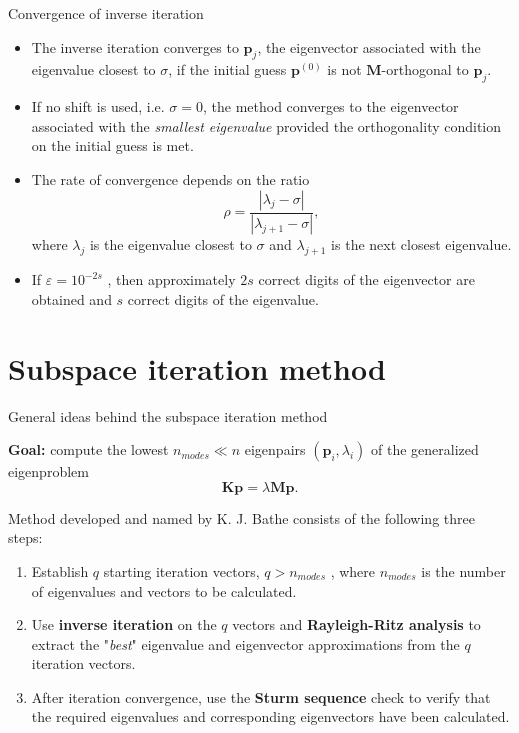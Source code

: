 \documentclass[aspectratio=169]{beamer}
\begin{document}
\begin{frame}{Convergence of inverse iteration}
  \begin{tcolorbox}[colback=darkred!10,colframe=darkred!40!black]
    \begin{itemize}
      \item  The inverse iteration converges to $\mathbf p_j$, the eigenvector associated with the eigenvalue closest to \( \sigma \), if the initial guess $\mathbf p^{(0)}$ is not $\mathbf M$-orthogonal to $\mathbf p_j$.
      \item     If no shift is used, i.e. $\sigma=0$, the method converges to the eigenvector associated with the \emph{smallest eigenvalue} provided the orthogonality condition on the initial guess is met.
    \end{itemize}
  \end{tcolorbox}
  \begin{itemize}
    \item The rate of convergence depends on the ratio
          \[
            \rho = \frac{|\lambda_j - \sigma|}{|\lambda_{j+1} - \sigma|},
          \]
          where \( \lambda_j \) is the eigenvalue closest to \( \sigma \) and \( \lambda_{j+1} \) is the next closest eigenvalue.
    \item If $\varepsilon=10^{-2s}$ , then approximately \( 2s \) correct digits of the eigenvector are obtained and \( s \) correct digits of the eigenvalue.
  \end{itemize}
\end{frame}

\section{Subspace iteration method}

\begin{frame}{General ideas behind the subspace iteration method}
  \vspace{-0.2cm}
  \begin{block}{}
    \textbf{Goal:} compute the lowest \( n_{modes} \ll n \) eigenpairs \( (\mathbf p_i, \lambda_i) \) of the generalized eigenproblem
    $$\mathbf K\mathbf p = \lambda\mathbf M \mathbf p.$$
  \end{block}
  Method developed and named by K. J. Bathe consists of the following three steps:
  \begin{enumerate}
    \item Establish $q$ starting iteration vectors, $q> n_{modes}$ , where $n_{modes}$ is the number of eigenvalues and vectors to be calculated.
    \item Use \textbf{inverse iteration} on the $q$ vectors and \textbf{Rayleigh-Ritz analysis} to extract the "\emph{best}" eigenvalue and eigenvector approximations from the $q$ iteration vectors.
    \item After iteration convergence, use the \textbf{Sturm sequence} check to verify that the required eigenvalues and corresponding eigenvectors have been calculated.
  \end{enumerate}
\end{frame}
\end{document}
